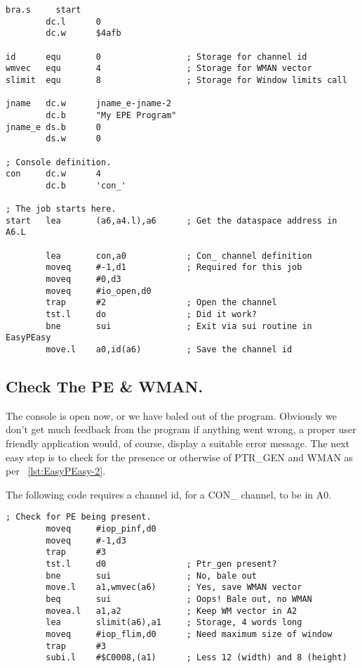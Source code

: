\begin{lstlisting}[firstnumber=1,caption={EasyPEasy Standard Code - Initialisation},label={lst:EasyPEasy-1}]
        bra.s     start
        dc.l      0
        dc.w      $4afb

id      equ       0                 ; Storage for channel id
wmvec   equ       4                 ; Storage for WMAN vector
slimit  equ       8                 ; Storage for Window limits call

jname   dc.w      jname_e-jname-2
        dc.b      "My EPE Program"
jname_e ds.b      0
        ds.w      0

; Console definition.
con     dc.w      4
        dc.b      'con_'

; The job starts here.
start   lea       (a6,a4.l),a6      ; Get the dataspace address in A6.L

        lea       con,a0            ; Con_ channel definition
        moveq     #-1,d1            ; Required for this job
        moveq     #0,d3                          
        moveq     #io_open,d0
        trap      #2                ; Open the channel
        tst.l     do                ; Did it work?
        bne       sui               ; Exit via sui routine in EasyPEasy
        move.l    a0,id(a6)         ; Save the channel id
\end{lstlisting}

\subsection{Check The PE \& WMAN.}

The console is open now, or we have baled out of the program.
      Obviously we don't get much feedback from the program if anything went
      wrong, a proper user friendly application would, of course, display a
      suitable error message. The next easy step is to check for the presence
      or otherwise of PTR\_GEN and WMAN as per \lstlistingname~\ref{lst:EasyPEasy-2}.

The following code requires a channel id, for a CON\_ channel, to
      be in A0.

\begin{lstlisting}[firstnumber=last,caption={EasyPEasy Standard Code - Checking for the PE},label={lst:EasyPEasy-2}]
; Check for PE being present.
        moveq     #iop_pinf,d0
        moveq     #-1,d3
        trap      #3
        tst.l     d0                ; Ptr_gen present?
        bne       sui               ; No, bale out
        move.l    a1,wmvec(a6)      ; Yes, save WMAN vector
        beq       sui               ; Oops! Bale out, no WMAN
        movea.l   a1,a2             ; Keep WM vector in A2
        lea       slimit(a6),a1     ; Storage, 4 words long
        moveq     #iop_flim,d0      ; Need maximum size of window
        trap      #3
        subi.l    #$C0008,(a1)      ; Less 12 (width) and 8 (height)
\end{lstlisting}

